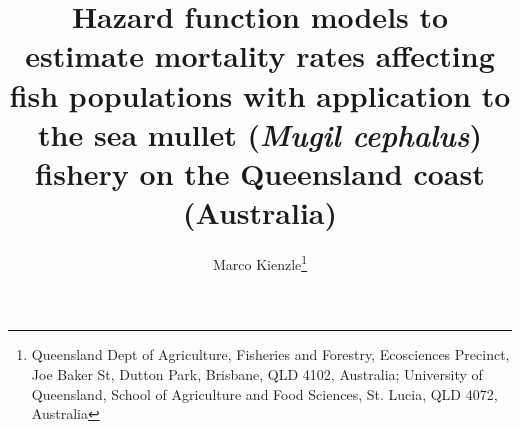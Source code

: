\documentclass[12pt]{article}
\begin{document}
\linenumbers


\setlength{\textheight}{575pt}
\setlength{\baselineskip}{23pt}


\title{Hazard function models to estimate mortality rates affecting fish populations with application to the sea mullet ({\it Mugil cephalus}) fishery on the Queensland coast (Australia)}

\author{Marco Kienzle\footnote{Queensland Dept of Agriculture, Fisheries and Forestry, Ecosciences Precinct, Joe Baker St, Dutton Park, Brisbane, QLD 4102, Australia; \newline University of Queensland, School of Agriculture and Food Sciences, St. Lucia, QLD 4072, Australia}}


\maketitle
\end{document}

